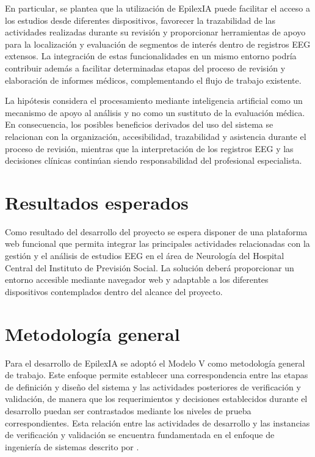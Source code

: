 En particular, se plantea que la utilización de EpilexIA puede facilitar el
acceso a los estudios desde diferentes dispositivos, favorecer la
trazabilidad de las actividades realizadas durante su revisión y proporcionar
herramientas de apoyo para la localización y evaluación de segmentos de
interés dentro de registros EEG extensos. La integración de estas
funcionalidades en un mismo entorno podría contribuir además a facilitar
determinadas etapas del proceso de revisión y elaboración de informes
médicos, complementando el flujo de trabajo existente.

La hipótesis considera el procesamiento mediante inteligencia artificial como
un mecanismo de apoyo al análisis y no como un sustituto de la evaluación
médica. En consecuencia, los posibles beneficios derivados del uso del
sistema se relacionan con la organización, accesibilidad, trazabilidad y
asistencia durante el proceso de revisión, mientras que la interpretación de
los registros EEG y las decisiones clínicas continúan siendo responsabilidad
del profesional especialista.

\section{Resultados esperados}
\label{sec:resultados-esperados}

Como resultado del desarrollo del proyecto se espera disponer de una
plataforma web funcional que permita integrar las principales actividades
relacionadas con la gestión y el análisis de estudios EEG en el área de
Neurología del Hospital Central del Instituto de Previsión Social. La
solución deberá proporcionar un entorno accesible mediante navegador web
y adaptable a los diferentes dispositivos contemplados dentro del alcance
del proyecto.

\section{Metodología general}
\label{sec:metodologia-general}

Para el desarrollo de EpilexIA se adoptó el Modelo V como metodología
general de trabajo. Este enfoque permite establecer una correspondencia
entre las etapas de definición y diseño del sistema y las actividades
posteriores de verificación y validación, de manera que los requerimientos
y decisiones establecidos durante el desarrollo puedan ser contrastados
mediante los niveles de prueba correspondientes. Esta relación entre
las actividades de desarrollo y las instancias de verificación y
validación se encuentra fundamentada en el enfoque de ingeniería de
sistemas descrito por \citet{ForsbergMooz1991}.

